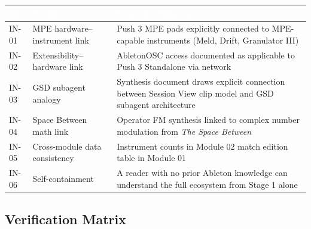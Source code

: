 \documentclass[11pt,letterpaper]{article}
\newcommand{\tableheader}[1]{\textbf{\sffamily\textcolor{white}{#1}}}
\begin{document}
\begin{center}
\begin{tabularx}{\textwidth}{C{1.5cm}L{4cm}X}
\toprule
{}
\tableheader{ID} & \tableheader{Verifies} & \tableheader{Expected Behavior} \\
\midrule
IN-01 & MPE hardware--instrument link & Push 3 MPE pads explicitly connected to MPE-capable instruments (Meld, Drift, Granulator III) \\
IN-02 & Extensibility--hardware link & AbletonOSC access documented as applicable to Push 3 Standalone via network \\
IN-03 & GSD subagent analogy & Synthesis document draws explicit connection between Session View clip model and GSD subagent architecture \\
IN-04 & Space Between math link & Operator FM synthesis linked to complex number modulation from \textit{The Space Between} \\
IN-05 & Cross-module data consistency & Instrument counts in Module 02 match edition table in Module 01 \\
IN-06 & Self-containment & A reader with no prior Ableton knowledge can understand the full ecosystem from Stage 1 alone \\
\bottomrule
\end{tabularx}
\end{center}

\subsection{Verification Matrix}
\end{document}
